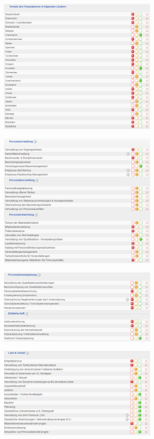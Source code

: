 \documentclass[12pt]{article}
\begin{document}
\noindent
\begin{figure}[here!]
\centering
\includegraphics[width=0.7\textwidth]{images/tr4}
\end{figure}\FloatBarrier
\noindent
\begin{figure}[here!]
\centering
\includegraphics[width=0.7\textwidth]{images/tr5}
\end{figure}\FloatBarrier
\noindent
\begin{figure}[here!]
\centering
\includegraphics[width=0.7\textwidth]{images/tr6}
\end{figure}\FloatBarrier
\noindent
\begin{figure}[here!]
\centering
\includegraphics[width=0.7\textwidth]{images/tr7}
\end{figure}\FloatBarrier
\end{document}
